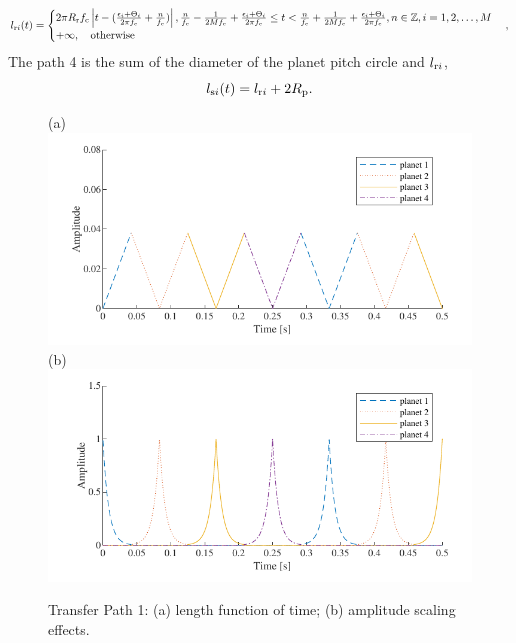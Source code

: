 \documentclass[a4paper,fleqn]{cas-sc}%
\begin{document}
\begin{equation}
    l_{{\rm r}i}(t)=
    \begin{cases}
        2 \pi R_{\rm r} f_{\rm c} \left|t-(\frac{\epsilon_i+\Theta_i}{2 \pi f_{\rm c}} + \frac{n}{f_{\rm c}}) \right|, \frac{n}{f_{\rm c}} - \frac{1}{2 M f_{\rm c}} + \frac{\epsilon_i+\Theta_i}{2\pi  f_{\rm c}} \leq t < \frac{n}{f_{\rm c}} + \frac{1}{2 M f_{\rm c}} + \frac{\epsilon_i+\Theta_i}{2\pi f_{\rm c}}, n\in \mathbb{Z} , i=1,2,\ldots,M\\
        +\infty, \quad \text{otherwise}
    \end{cases},
\end{equation}
The path 4 is the sum of the diameter of the planet pitch circle and $l_{{\rm r}i}$,
\begin{equation}
    l_{{\rm s}i}(t)=l_{{\rm r}i}+2 R_{\rm p}. \label{eq:path_4_length}
\end{equation}
\begin{figure}[pos=htbp]
    \centering
    (a) \includegraphics[scale=0.7,valign=t]{trangle_wave.pdf}\\
    (b) \includegraphics[scale=0.7,valign=t]{transfer_path_timedomain.pdf}
    \caption{Transfer Path 1: (a) length function of time; (b) amplitude scaling effects.}
    \label{fig:transfer_path_effect}
\end{figure}
\end{document}
